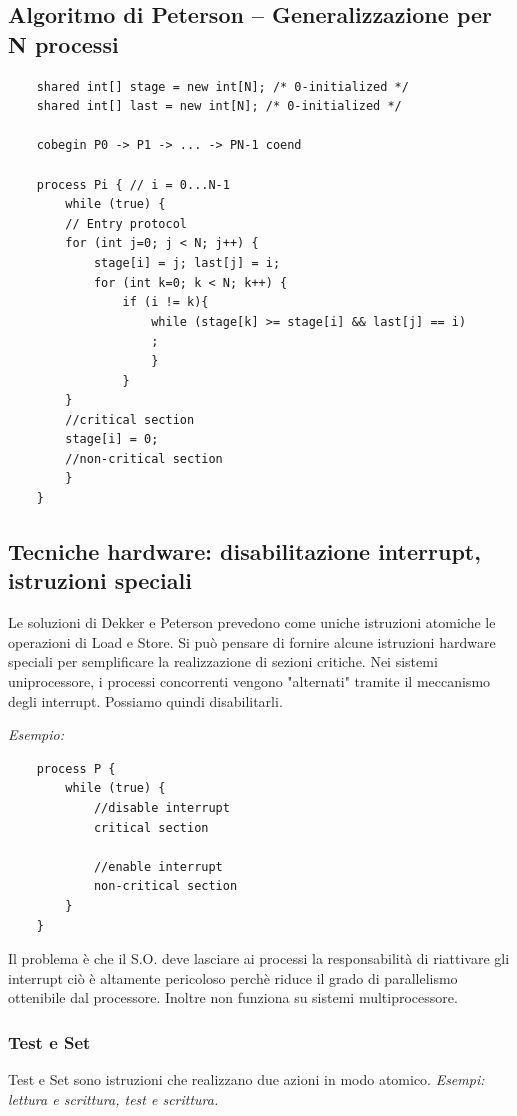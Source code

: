 \subsection{Algoritmo di Peterson – Generalizzazione per N processi}

\begin{lstlisting}
    shared int[] stage = new int[N]; /* 0-initialized */
    shared int[] last = new int[N]; /* 0-initialized */
    
    cobegin P0 -> P1 -> ... -> PN-1 coend

    process Pi { // i = 0...N-1 
        while (true) {
        // Entry protocol
        for (int j=0; j < N; j++) {
            stage[i] = j; last[j] = i;
            for (int k=0; k < N; k++) {
                if (i != k){
                    while (stage[k] >= stage[i] && last[j] == i)
                    ;
                    }
                }
        }
        //critical section
        stage[i] = 0;
        //non-critical section
        }
    }
\end{lstlisting}



\subsection{Tecniche hardware: disabilitazione interrupt, istruzioni speciali}
Le soluzioni di Dekker e Peterson prevedono come uniche istruzioni
atomiche le operazioni di Load e Store. Si può pensare di fornire alcune istruzioni hardware speciali per semplificare la realizzazione di sezioni critiche.
Nei sistemi uniprocessore, i processi concorrenti vengono "alternati" tramite il meccanismo degli interrupt.
Possiamo quindi disabilitarli.
\newline

\textit{Esempio:}

\begin{lstlisting}
    process P {
        while (true) {
            //disable interrupt
            critical section

            //enable interrupt
            non-critical section
        }
    }
\end{lstlisting}

Il problema è che il S.O. deve lasciare ai processi la responsabilità di riattivare gli interrupt ciò è altamente pericoloso perchè riduce il grado di parallelismo ottenibile dal processore. Inoltre non funziona su sistemi multiprocessore.
\newpage

\subsubsection{Test e Set}
Test e Set sono istruzioni che realizzano due azioni in modo atomico.
\textit{Esempi: lettura e scrittura, test e scrittura.}


